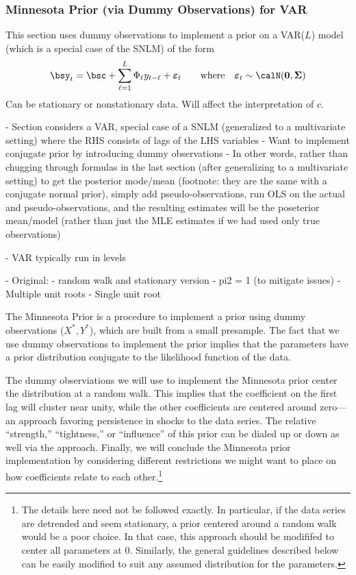 \documentclass[12pt]{article}
\theoremstyle{plain}
\theoremstyle{definition}
\theoremstyle{remark}
\newcommand{\bsSigma}{\boldsymbol{\Sigma}}
\newcommand{\bsvarepsilon}{\boldsymbol{\varepsilon}}
\renewcommand{\bso}{\boldsymbol{0}}
\begin{document}
\clearpage
\subsubsection{Minnesota Prior (via Dummy Observations) for VAR}

This section uses dummy observations to implement a prior on a VAR($L$)
model (which is a special case of the SNLM) of the form
\begin{align*}
  \bsy_t = \bsc + \sum_{\ell=1}^L \Phi_\ell y_{t-\ell} + \bsvarepsilon_t
  \qquad\text{where}\quad
  \bsvarepsilon_t \sim \calN(\bso,\bsSigma)
\end{align*}
Can be stationary or nonstationary data. Will affect the interpretation
of $c$.

- Section considers a VAR, special case of a SNLM (generalized to a
multivariate setting) where the RHS consists of lags of the LHS
variables
- Want to implement conjugate prior by introducing dummy observations
- In other words, rather than chugging through formulas in the last
section (after generalizing to a multivariate setting) to get the
posterior mode/mean (footnote: they are the same with a
conjugate normal prior), simply add pseudo-observations, run OLS on the
actual and pseudo-observations, and the resulting estimates will be the
poseterior mean/model (rather than just the MLE estimates if we had used
only true observations)

- VAR typically run in levels

- Original:
  - random walk and stationary version
  - pi2 = 1 (to mitigate issues)
- Multiple unit roots
- Single unit root


The Minnesota Prior is a procedure to implement a prior
using dummy observations ($X^*, Y^*$), which
are built from a small presample.  The fact that we
use dummy observations to implement the prior implies
that the parameters have a prior distribution
conjugate to the likelihood function of the data.

The dummy observiations we will use to implement the
Minnesota prior center the distribution at a random walk.
This implies that the coefficient on the first lag will
cluster near unity, while the other coefficients are
centered around
zero---an approach favoring persistence in shocks to the
data series. The relative ``strength,'' ``tightness,'' or
``influence'' of this prior can be dialed up or down as well
via the approach.
Finally, we will conclude the Minnesota prior implementation
by considering different restrictions we might want to place
on how coefficients relate to each other.\footnote{The
details here need not be followed exactly.  In particular,
if the data series are detrended and seem stationary, a
prior centered around a random walk would be a poor choice.
In that case, this approach should be modififed to center
all parameters at 0.  Similarly, the general guidelines
described below can be easily modified to suit any assumed
distribution for the parameters.}
\end{document}
